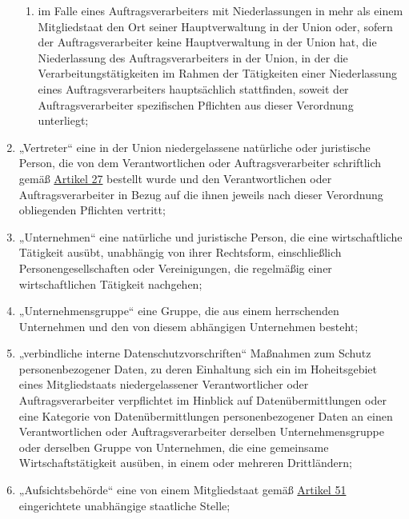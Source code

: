 \begin{enumerate}
\begin{enumerate}
    \item im Falle eines Auftragsverarbeiters mit Niederlassungen in mehr als einem Mitgliedstaat den Ort seiner
     Hauptverwaltung in der Union oder, sofern der Auftragsverarbeiter keine Hauptverwaltung in der Union hat, die
     Niederlassung des Auftragsverarbeiters in der Union, in der die Verarbeitungstätigkeiten im Rahmen der Tätigkeiten
     einer Niederlassung eines Auftragsverarbeiters hauptsächlich stattfinden, soweit der Auftragsverarbeiter
     spezifischen Pflichten aus dieser Verordnung unterliegt;
    \label{itm:04-16b}

  \end{enumerate}

  \item „Vertreter“ eine in der Union niedergelassene natürliche oder juristische Person, die von dem Verantwortlichen
   oder Auftragsverarbeiter schriftlich gemäß \hyperref[ch:27]{Artikel 27} bestellt wurde und den Verantwortlichen oder
   Auftragsverarbeiter in Bezug auf die ihnen jeweils nach dieser Verordnung obliegenden Pflichten vertritt;
  \label{itm:04-17}

  \item „Unternehmen“ eine natürliche und juristische Person, die eine wirtschaftliche Tätigkeit ausübt, unabhängig von
   ihrer Rechtsform, einschließlich Personengesellschaften oder Vereinigungen, die regelmäßig einer wirtschaftlichen
   Tätigkeit nachgehen;
  \label{itm:04-18}

  \item „Unternehmensgruppe“ eine Gruppe, die aus einem herrschenden Unternehmen und den von diesem abhängigen
   Unternehmen besteht;
  \label{itm:04-19}

  \item „verbindliche interne Datenschutzvorschriften“ Maßnahmen zum Schutz personenbezogener Daten, zu deren Einhaltung
   sich ein im Hoheitsgebiet eines Mitgliedstaats niedergelassener Verantwortlicher oder Auftragsverarbeiter
   verpflichtet im Hinblick auf Datenübermittlungen oder eine Kategorie von Datenübermittlungen personenbezogener Daten
   an einen Verantwortlichen oder Auftragsverarbeiter derselben Unternehmensgruppe oder derselben Gruppe von
   Unternehmen, die eine gemeinsame Wirtschaftstätigkeit ausüben, in einem oder mehreren Drittländern;
  \label{itm:04-20}

  \item „Aufsichtsbehörde“ eine von einem Mitgliedstaat gemäß \hyperref[ch:51]{Artikel 51} eingerichtete unabhängige
   staatliche Stelle;
  \label{itm:04-21}   


\end{enumerate}
